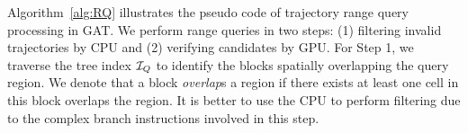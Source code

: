 \documentclass[10pt,conference,letterpaper]{IEEEtran}
\newcommand{\frname}{GAT\xspace }
\newcommand{\rangecand}{{{\cal Q}_r^c}\xspace}
\newcommand{\treeindex}{{{\cal I}_Q}\xspace}
\newcommand{\eat}[1]{}
\begin{document}
\eat{
	\begin{algorithm}[t]
		\algsetup{linenosize=\tiny}
		\small
		\caption{Verification on GPU}
		\label{alg:verifyTrajRQ}
		\begin{algorithmic}[1]
			\REQUIRE ~~\\
			query region $R$; candidate blocks $\rangecand$; number of threads in a CUDA block $N_{th}$
			\ENSURE ~~\\
			result bitmap ${\cal B}_r$;
			\FOR{each CUDA block $bID \in [0,size(\rangecand)-1]$ \textbf{parallelly}}
				\STATE ${\cal P} \leftarrow$ extractPoints();
				\FOR{$i\in [0,size({\cal P})/N_{th}-1]$}
					\FOR{each CUDA thread $thID \in [0,N_{th}-1]$ \textbf{parallelly}}
						\STATE $p \leftarrow {\cal P}[i*N_{th} + thID]$;
						\IF{$p\in R$}
							\STATE ${\cal B}_r[p.tID]\leftarrow TRUE$;
						\ENDIF
					\ENDFOR
				\ENDFOR
			\ENDFOR
			\RETURN ${\cal B}_r$
		\end{algorithmic}
	\end{algorithm}
}



Algorithm~\ref{alg:RQ} illustrates the pseudo code of trajectory range query processing in \frname. We perform range queries in two steps: (1) filtering invalid trajectories by CPU and
(2) verifying candidates by GPU. For Step 1, we traverse the tree index $\treeindex$ to identify the blocks spatially overlapping the query region. We denote that a block \emph{overlap}s a region if there exists at least one cell in this block overlaps the region.
It is better to use the CPU to perform filtering due to the complex branch instructions involved in this step. 

\end{document}
